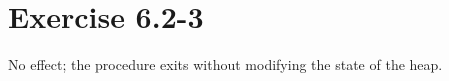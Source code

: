 \documentclass{article}
\begin{document}
\section*{Exercise 6.2-3}

No effect; the procedure exits without modifying the state of the heap.
\end{document}
